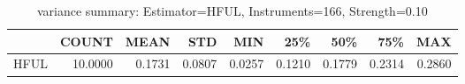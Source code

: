 \begin{table}[ht]
\centering
\caption{variance summary: Estimator=HFUL, Instruments=166, Strength=0.10}
\begin{tabular}{lrrrrrrrr}
\toprule
 & COUNT & MEAN & STD & MIN & 25\% & 50\% & 75\% & MAX \\
\midrule
HFUL & 10.0000 & 0.1731 & 0.0807 & 0.0257 & 0.1210 & 0.1779 & 0.2314 & 0.2860 \\
\bottomrule
\end{tabular}
\end{table}
